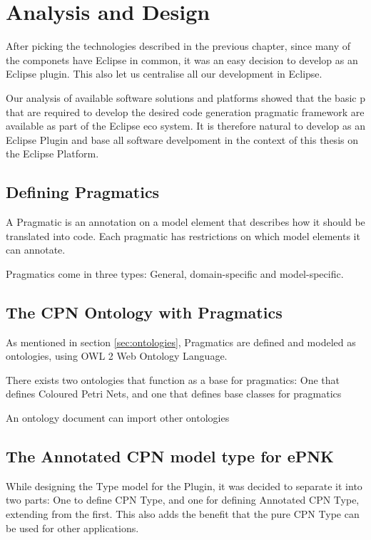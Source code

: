 \chapter{Analysis and Design}
\label{chap:analysis}


After picking the technologies described in the previous chapter, since many of
the componets have Eclipse in common, it was an easy decision to develop
\thename{} as an Eclipse plugin. This also let us centralise all our development
in Eclipse.

Our analysis of available software solutions and platforms showed that the basic
p that are required to develop the desired code generation pragmatic framework are available as part of the Eclipse
eco system. It is therefore natural to develop \thename{} as an Eclipse Plugin
and base all software develpoment in the context of this thesis on the Eclipse
Platform.

\section{Defining Pragmatics}

A Pragmatic is an annotation on a model element that describes how it should be
translated into code. Each pragmatic has restrictions on which model elements it
can annotate.

Pragmatics come in three types: General, domain-specific and model-specific.



\section{The CPN Ontology with Pragmatics}
As mentioned in section \ref{sec:ontologies}, Pragmatics are defined and modeled
as ontologies, using OWL 2 Web Ontology Language.  

There exists two ontologies that function as a base for pragmatics: One that
defines Coloured Petri Nets, and one that defines base classes for pragmatics


An ontology document can import other ontologies 

\section{The Annotated CPN model type for ePNK}
While designing the Type model for the Plugin, it was decided to separate it
into two parts: One to define CPN Type, and one for defining Annotated CPN Type,
extending from the first. This also adds the benefit that the pure CPN Type can
be used for other applications.

